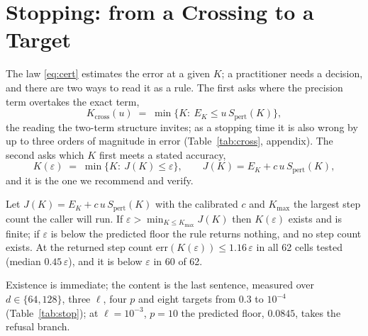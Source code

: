 \section{Stopping: from a Crossing to a Target}
\label{sec:stopping}

The law \eqref{eq:cert} estimates the error at a given $K$; a practitioner needs a
decision, and there are two ways to read it as a rule.  The first asks where the precision
term overtakes the exact term,
\begin{equation}
K_{\mathrm{cross}}(u) \;=\; \min\{K:\ E_K \le u\,S_{\mathrm{pert}}(K)\},
\label{eq:cross}
\end{equation}
the reading the two-term structure invites; as a stopping time it is also wrong by up to
three orders of magnitude in error (Table~\ref{tab:cross}, appendix).  The second asks which $K$ first meets a stated accuracy,
\begin{equation}
K(\varepsilon) \;=\; \min\{K:\ J(K) \le \varepsilon\},
\qquad J(K) = E_K + c\,u\,S_{\mathrm{pert}}(K),
\label{eq:target}
\end{equation}
and it is the one we recommend and verify.

\begin{theorem}
\label{thm:stop}
Let $J(K) = E_K + c\,u\,S_{\mathrm{pert}}(K)$ with the calibrated $c$ and $K_{\max}$ the
largest step count the caller will run.  If $\varepsilon > \min_{K \le K_{\max}} J(K)$
then $K(\varepsilon)$ exists and is finite; if $\varepsilon$ is below the predicted floor
the rule returns nothing, and no step count exists.  At the returned step count
$\mathrm{err}(K(\varepsilon)) \le 1.16\,\varepsilon$ in all 62 cells tested (median
$0.45\,\varepsilon$), and it is below $\varepsilon$ in 60 of 62.
\end{theorem}

Existence is immediate; the content is the last sentence, measured over
$d\in\{64,128\}$, three $\ell$, four $p$ and eight
targets from $0.3$ to $10^{-4}$ (Table~\ref{tab:stop}); at $\ell=10^{-3}$, $p=10$ the
predicted floor, $0.0845$, takes the refusal branch.

